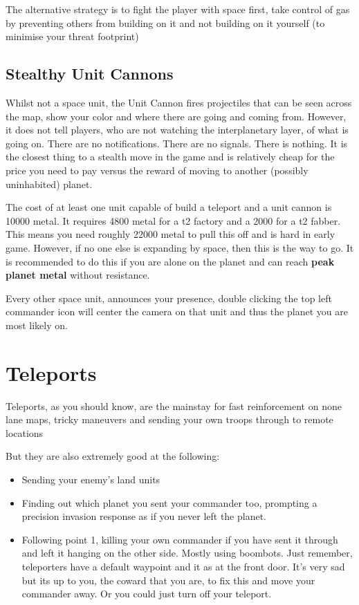\documentclass[]{article}
\begin{document}
The alternative strategy is to fight the player with space first, take control of gas by preventing others from building on it and not building on it yourself (to minimise your threat footprint)

\subsection{Stealthy Unit Cannons}
\label{sec:stealthyucannons} 
Whilst not a space unit, the Unit Cannon fires projectiles that can be seen across the map, show your color and where there are going and coming from.  However, it does not tell players, who are not watching the interplanetary layer, of what is going on.  There are no notifications.  There are no signals.  There is nothing.  It is the closest thing to a stealth move in the game and is relatively cheap for the price you need to pay versus the reward of moving to another (possibly uninhabited) planet.  

The cost of at least one unit capable of build a teleport and a unit cannon is 10000 metal.  It requires 4800 metal for a t2 factory and a 2000 for a t2 fabber.  This means you need roughly 22000 metal to pull this off and is hard in early game.  However, if no one else is expanding by space, then this is the way to go.  It is recommended to do this if you are alone on the planet and can reach \textbf{peak planet metal} without resistance.  

Every other space unit, announces your presence, double clicking the top left commander icon will center the camera on that unit and thus the planet you are most likely on.   

\newpage
\section{Teleports}

Teleports, as you should know, are the mainstay for fast reinforcement on none lane maps, tricky maneuvers and sending your own troops through to remote locations

But they are also extremely good at the following:
\begin{itemize}
	\item Sending your enemy's land units
	\item Finding out which planet you sent your commander too, prompting a precision invasion response as if you never left the planet.  
	\item Following point 1, killing your own commander if you have sent it through and left it hanging on the other side.  Mostly using boombots.  Just remember, teleporters have a default waypoint and it as at the front door.  It's very sad but its up to you, the coward that you are, to fix this and move your commander away.  Or you could just turn off your teleport.  
\end{itemize}
\end{document}
